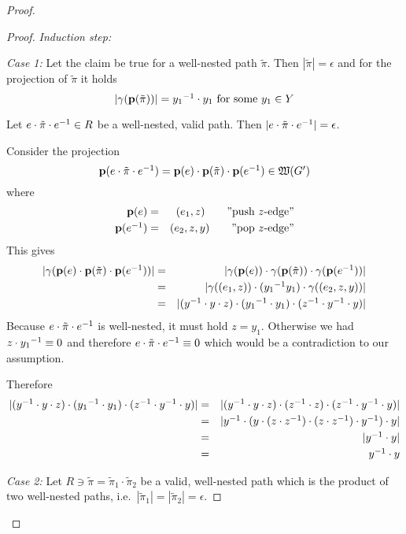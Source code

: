 \begin{proof}
\begin{proof}
\medskip
{\em Induction step:}

{\em Case 1:} Let the claim be true for a well-nested path $\tilde{\pi}$. Then
$|\tilde{\pi}| = \epsilon$ and for the projection of $\tilde{\pi}$ it holds
\[ |\gamma(\mathbf{p}({\tilde{\pi}}))| = \mbox{${y_1}^{-1}$} \cdot y_1\text{ for some }y_1 \in Y
\]

Let $e \cdot \tilde{\pi} \cdot \mbox{${e}^{-1}$} \in R$ be a well-nested, valid path. Then
$|e \cdot \tilde{\pi} \cdot \mbox{${e}^{-1}$}| = \epsilon$.

Consider the projection
\[ \mathbf{p}({e \cdot \tilde{\pi} \cdot \mbox{${e}^{-1}$}}) = \mathbf{p}({e}) \cdot \mathbf{p}({\tilde{\pi}})
\cdot \mathbf{p}({\mbox{${e}^{-1}$}}) \in \mbox{$\mathfrak{W}({G'})$} \]
where
\begin{eqnarray*}
\mathbf{p}({e}) &=& (e_1, z) \qquad\text{''push $z$-edge''}\\
\mathbf{p}({\mbox{${e}^{-1}$}}) &=& (e_2, z, y) \qquad\text{''pop $z$-edge''}\\
\end{eqnarray*}
This gives
\begin{eqnarray*}
|\gamma(\mathbf{p}({e}) \cdot \mathbf{p}({\tilde{\pi}}) \cdot \mathbf{p}({\mbox{${e}^{-1}$}}))|&=&
|\gamma(\mathbf{p}({e})) \cdot \gamma(\mathbf{p}({\tilde{\pi}})) \cdot \gamma(\mathbf{p}({\mbox{${e}^{-1}$}}))|
\\
&=&|\gamma((e_1, z)) \cdot  (\mbox{${y_1}^{-1}$} y_1) \cdot \gamma((e_2, z, y))| \\
&=& |(\mbox{${y}^{-1}$} \cdot y \cdot z) \cdot (\mbox{${y_1}^{-1}$} \cdot y_1) \cdot (\mbox{${z}^{-1}$} \cdot
\mbox{${y}^{-1}$} \cdot y)| \\
\end{eqnarray*}
Because $e \cdot \tilde{\pi} \cdot \mbox{${e}^{-1}$}$ is well-nested, it must hold
$z = y_1$. Otherwise we had $z \cdot \mbox{${y_1}^{-1}$} \equiv 0$ and therefore $e \cdot
\tilde{\pi} \cdot \mbox{${e}^{-1}$} \equiv 0$ which would be a contradiction to our
assumption.

Therefore
\begin{eqnarray*}
|(\mbox{${y}^{-1}$} \cdot y \cdot z) \cdot (\mbox{${y_1}^{-1}$} \cdot y_1) \cdot (\mbox{${z}^{-1}$} \cdot
\mbox{${y}^{-1}$} \cdot y)| &=&
|(\mbox{${y}^{-1}$} \cdot y \cdot z) \cdot (\mbox{${z}^{-1}$} \cdot z) \cdot (\mbox{${z}^{-1}$} \cdot
\mbox{${y}^{-1}$} \cdot y)| \\
&=& |\mbox{${y}^{-1}$} \cdot (y \cdot (z \cdot \mbox{${z}^{-1}$}) \cdot (z \cdot \mbox{${z}^{-1}$}) \cdot
\mbox{${y}^{-1}$}) \cdot y| \\
&=& |\mbox{${y}^{-1}$} \cdot y| \\
&=& \mbox{${y}^{-1}$}  \cdot y
\end{eqnarray*}

\medskip
{\em Case 2:} Let $R \ni \tilde{\pi} = \tilde{\pi}_1 \cdot \tilde{\pi}_2$ be a
valid, well-nested path which is the product of two well-nested paths, i.e.\
$|\tilde{\pi}_1| = |\tilde{\pi}_2| = \epsilon$.


\end{proof}
\end{proof}
